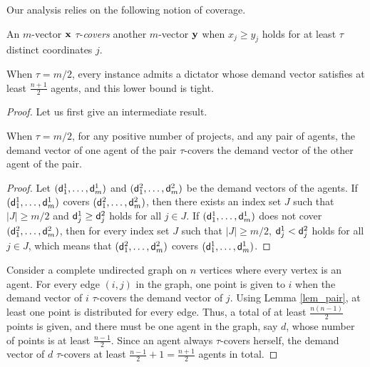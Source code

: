 \documentclass{article}
\begin{document}
Our analysis relies on the following notion of coverage.

\begin{definition} \label{def_cov}
An $m$-vector ${\bf x}$ $\tau$-\emph{covers} another $m$-vector ${\bf y}$ when $x_j \ge y_j$ holds for at least $\tau$ 
distinct coordinates $j$.
\end{definition}


\begin{theorem} \label{thm_dict} When  $\tau=m/2$, every instance admits a dictator whose demand vector satisfies at least $\frac{n+1}{2}$ agents, and this lower bound is tight.
\end{theorem}
\begin{proof} Let us first give an intermediate result. 


\begin{lemma} \label{lem_pair} When $\tau=m/2$, for any positive number of projects, and any pair of agents, the demand vector of one agent of the pair $\tau$-covers the demand vector of the other agent of the pair.  
\end{lemma}

\begin{proof} Let $({\sf d}^1_1, \ldots, {\sf d}^1_m)$ and $({\sf d}^2_1, \ldots, {\sf d}^2_m)$ be the demand vectors of the agents. If $({\sf d}^1_1, \ldots, {\sf d}^1_m)$ covers $({\sf d}^2_1, \ldots, {\sf d}^2_m)$, then there exists an index set $J$ such that $|J|\ge m/2$ and ${\sf d}^1_j \ge {\sf d}^2_j$ holds for all $j \in J$. If $({\sf d}^1_1, \ldots, {\sf d}^1_m)$ does not cover $({\sf d}^2_1, \ldots, {\sf d}^2_m)$, then for every index set $J$ such that $|J|\ge m/2$, ${\sf d}^1_j < {\sf d}^2_j$ holds for all $j \in J$, which means that $({\sf d}^2_1, \ldots, {\sf d}^2_m)$ covers $({\sf d}^1_1, \ldots, {\sf d}^1_m)$. \end{proof}

Consider a complete undirected graph on $n$ vertices where every vertex is an agent.  For every edge $(i,j)$ in the graph, one point is given to $i$ when the demand vector of $i$ $\tau$-covers the demand vector of $j$. Using Lemma \ref{lem_pair}, at least one point is distributed for every edge. Thus, a total of at least $\frac{n(n-1)}{2}$ points is given, and there must be one agent in the graph, say $d$, whose number of points is at least $\frac{n-1}{2}$. Since an agent always $\tau$-covers herself, the demand vector of $d$ $\tau$-covers at least $\frac{n-1}{2}+1=\frac{n+1}{2}$ agents in total.      




\end{proof}
\end{document}
